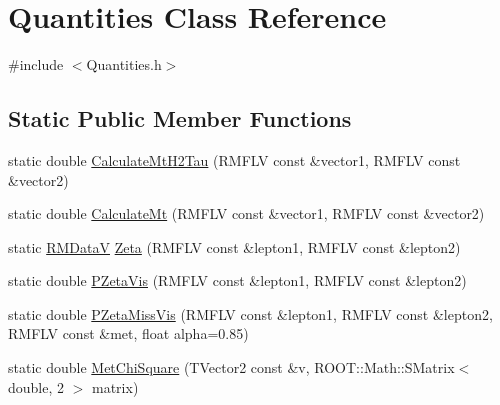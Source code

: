 \hypertarget{classQuantities}{
\section{Quantities Class Reference}
\label{classQuantities}
}


{\ttfamily \#include $<$Quantities.h$>$}\subsection*{Static Public Member Functions}
\begin{DoxyCompactItemize}
\item 
static double \hyperlink{classQuantities_a357019790083b57fd3a33c0aab74b005}{CalculateMtH2Tau} (RMFLV const \&vector1, RMFLV const \&vector2)
\item 
static double \hyperlink{classQuantities_a0c2473ce5b63c18bcefad649abccc71a}{CalculateMt} (RMFLV const \&vector1, RMFLV const \&vector2)
\item 
static \hyperlink{SvfitTools_8h_aaf454bd335994d52523052c77c343e3d}{RMDataV} \hyperlink{classQuantities_a214721799dc069fac3d24b19e5b4ffc8}{Zeta} (RMFLV const \&lepton1, RMFLV const \&lepton2)
\item 
static double \hyperlink{classQuantities_a91b49158b83fd623138f6b5968d0d294}{PZetaVis} (RMFLV const \&lepton1, RMFLV const \&lepton2)
\item 
static double \hyperlink{classQuantities_a70c44bbcb5e39b7cac66c77e0a13752a}{PZetaMissVis} (RMFLV const \&lepton1, RMFLV const \&lepton2, RMFLV const \&met, float alpha=0.85)
\item 
static double \hyperlink{classQuantities_af20e98e334d2757566a5a0b85949f130}{MetChiSquare} (TVector2 const \&v, ROOT::Math::SMatrix$<$ double, 2 $>$ matrix)
\end{DoxyCompactItemize}


